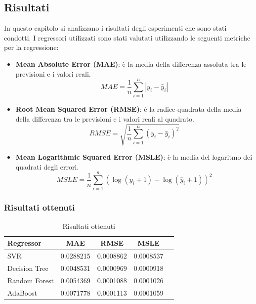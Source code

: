 \subsection{Risultati}

In questo capitolo si analizzano i risultati degli esperimenti che sono stati condotti. I regressori utilizzati sono stati valutati utilizzando le seguenti metriche per la regressione:
\begin{itemize}
    \item \textbf{Mean Absolute Error (MAE)}: è la media della differenza assoluta tra le previsioni e i valori reali.
    \begin{equation*}
        MAE = \frac{1}{n} \sum_{i=1}^{n} |y_i - \hat{y}_i|
    \end{equation*}
    \item \textbf{Root Mean Squared Error (RMSE)}: è la radice quadrata della media della differenza tra le previsioni e i valori reali al quadrato.
    \begin{equation*}
        RMSE = \sqrt{\frac{1}{n} \sum_{i=1}^{n} (y_i - \hat{y}_i)^2}
    \end{equation*}
    \item \textbf{Mean Logarithmic Squared Error (MSLE)}: è la media del logaritmo dei quadrati degli errori.
    \begin{equation*}
        MSLE = \frac{1}{n} \sum_{i=1}^{n} (\log(y_i + 1) - \log(\hat{y}_i + 1))^2
    \end{equation*}
\end{itemize}

\subsubsection{Risultati ottenuti}

\begin{table}[H]
    \centering
    \begin{tabular}{|>{\centering\arraybackslash}m{5cm}|c|c|c|c|}
        \hline
        \textbf{Regressor} & \textbf{MAE} & \textbf{RMSE} & \textbf{MSLE} \\ [10pt]
        \hline
        SVR & 0.0288215 & 0.0008862 & 0.0008537 \\ [10pt]
        \hline
        Decision Tree & 0.0048531 & 0.0000969 & 0.0000918 \\ [10pt]
        \hline
        Random Forest & 0.0054369 & 0.0001088 & 0.0001026 \\ [10pt]
        \hline
        AdaBoost & 0.0071778 & 0.0001113 & 0.0001059 \\ [10pt]
        \hline
    \end{tabular}
    \caption{Risultati ottenuti}
    \label{tab:results}
\end{table}

